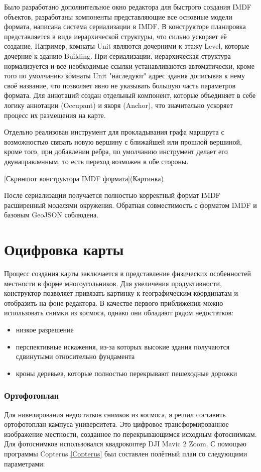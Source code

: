     Было разработано дополнительное окно редактора для быстрого создания IMDF объектов, разработаны компоненты представляющие все основные модели формата, написана система сериализации в IMDF. В конструкторе планировка представляется в виде иерархической структуры, что сильно ускоряет её создание. Например, комнаты Unit являются дочерними к этажу Level, которые дочерние к зданию Building. При сериализации, иерархическая структура нормализуется и все необходимые ссылки устанавливаются автоматически, кроме того по умолчанию комнаты Unit "наследуют" адрес здания дописывая к нему своё название, что позволяет явно не указывать большую часть параметров формата. Для аннотаций создан отдельный компонент, которые объединяет в себе логику аннотации (Occupant) и якоря (Anchor), что значительно ускоряет процесс их размещения на карте.

    Отдельно реализован инструмент для прокладывания графа маршрута с возможностью связать новую вершину с ближайшей или прошлой вершиной, кроме того, при добавлении ребра, по умолчанию инструмент делает его двунаправленным, то есть переход возможен в обе стороны.

    [Скриншот конструктора IMDF формата](Картинка)

    После сериализации получается полностью корректный формат IMDF расширенный моделями окружения. Обратная совместимость с форматом IMDF и базовым GeoJSON соблюдена.

  \section{Оцифровка карты}
    Процесс создания карты заключается в представление физических особенностей местности в форме многоугольников. Для увеличения продуктивности, конструктор позволяет привязать картинку к географическим координатам и отобразить на фоне редактора. В качестве первого приближения можно использовать снимки из космоса, однако они обладают рядом недостатков:
    \begin{itemize}
      \item низкое разрешение
      \item перспективные искажения, из-за которых высокие здания получаются сдвинутыми относительно фундамента
      \item кроны деревьев, которые полностью перекрывают пешеходные дорожки
    \end{itemize}

    \subsubsection{Ортофотоплан}
      Для нивелирования недостатков снимков из космоса, я решил составить ортофотоплан кампуса университета. Это цифровое трансформированное изображение местности, созданное по перекрывающимся исходным фотоснимкам. Для фотоснимков использовался квадрокоптер DJI Mavic 2 Zoom.
      С помощью программы Copterus \ref{Copterus} был составлен полётный план со следующими параметрами:

